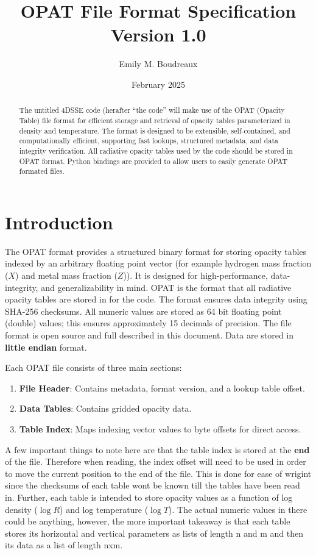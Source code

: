 \documentclass{article}
\title{\textbf{OPAT File Format Specification}\\Version 1.0}
\author{Emily M. Boudreaux}
\date{February 2025}
\begin{document}
\maketitle

\begin{abstract}
The untitled 4DSSE code (herafter ``the code'' will make use of the OPAT
  (Opacity Table) file format for efficient storage and retrieval of opacity
  tables parameterized in density and temperature. The format is designed to be
  extensible, self-contained, and computationally efficient, supporting fast
  lookups, structured metadata, and data integrity verification. All radiative
  opacity tables used by the code should be stored in OPAT format. Python
  bindings are provided to allow users to easily generate OPAT formated files.
\end{abstract}

\newpage

\section{Introduction}
The OPAT format provides a structured binary format for storing opacity tables
indexed by an arbitrary floating point vector (for example hydrogen mass
fraction ($X$) and metal mass fraction ($Z$)). It is designed for
high-performance, data-integrity, and generalizability in mind. OPAT is the
format that all radiative opacity tables are stored in for the code. The format
ensures data integrity using SHA-256 checksums. All numeric values are stored
as 64 bit floating point (double) values; this ensures approximately 15
decimals of precision. The file format is open source and full described in
this document. Data are stored in \textbf{little endian} format. 

\noindent Each OPAT file consists of three main sections:
\begin{enumerate}
    \item \textbf{File Header}: Contains metadata, format version, and a lookup table offset.
    \item \textbf{Data Tables}: Contains gridded opacity data.
    \item \textbf{Table Index}: Maps indexing vector values to byte offsets for direct access.
\end{enumerate}

\noindent A few important things to note here are that the table index is
stored at the \textbf{end} of the file. Therefore when reading, the index
offset will need to be used in order to move the current position to the end of
the file. This is done for ease of wrigint since the checksums of each table
wont be known till the tables have been read in. Further, each table is
intended to store opacity values as a function of log density ($\log R$) and
log temperature ($\log T$). The actual numeric values in there could be
anything, however, the more important takeaway is that each table stores its
horizontal and vertical parameters as lists of length n and m and then its data
as a list of length nxm.
\end{document}
